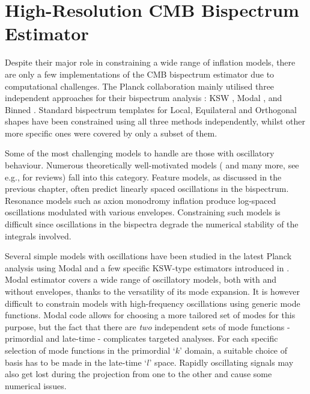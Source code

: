 \chapter{High-Resolution CMB Bispectrum Estimator} \label{chapter:high_resolution_cmb_bispectrum_estimator}

\ifpdf
    \graphicspath{{Chapter5/Figs/Raster/}{Chapter5/Figs/PDF/}{Chapter5/Figs/}}
\else
    \graphicspath{{Chapter5/Figs/Vector/}{Chapter5/Figs/}}
\fi

Despite their major role in constraining a wide range of inflation models, there are only a few implementations of the CMB bispectrum estimator due to computational challenges. The Planck collaboration mainly utilised three independent approaches for their bispectrum analysis \cite{PlanckCollaboration2013,PlanckCollaboration2015,PlanckCollaboration2018}: KSW \cite{Komatsu2005}, Modal \cite{Fergusson2012}, and Binned \cite{Bucher2010}. Standard bispectrum templates for Local, Equilateral and Orthogonal shapes have been constrained using all three methods independently, whilst other more specific ones were covered by only a subset of them.

Some of the most challenging models to handle are those with oscillatory behaviour. Numerous theoretically well-motivated models (\cite{Chen2010foldedResonant,Meerburg2009signatures,Meerburg2010nbd,Meerburg2011cutoff,Hazra2014} and many more, see e.g., \cite{Chen2010review,Chen2016} for reviews) fall into this category. Feature models, as discussed in the previous chapter, often predict linearly spaced oscillations in the bispectrum. Resonance models such as axion monodromy inflation \cite{Silverstein2008monodromy,Flauger2010monodromy} produce log-spaced oscillations modulated with various envelopes. Constraining such models is difficult since oscillations in the bispectra degrade the numerical stability of the integrals involved.

Several simple models with oscillations have been studied in the latest Planck analysis using Modal and a few specific KSW-type estimators introduced in \cite{Munchmeyer2014}. Modal estimator covers a wide range of oscillatory models, both with and without envelopes, thanks to the versatility of its mode expansion. It is however difficult to constrain models with high-frequency oscillations using generic mode functions. Modal code allows for choosing a more tailored set of modes for this purpose, but the fact that there are \textit{two} independent sets of mode functions - primordial and late-time - complicates targeted analyses. For each specific selection of mode functions in the primordial `$k$' domain, a suitable choice of basis has to be made in the late-time `$l$' space. Rapidly oscillating signals may also get lost during the projection from one to the other and cause some numerical issues.

